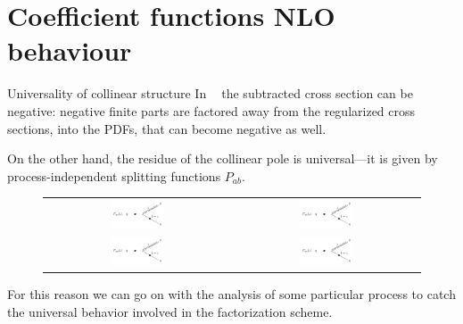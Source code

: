 \documentclass[9pt]{beamer}
\DeclareMathOperator{\msbar}{\overline{MS}}
\begin{document}
\section{Coefficient functions NLO behaviour}
\begin{frame}{Universality of collinear structure}
    In $\msbar$ the subtracted cross section can be negative: negative finite
    parts are factored away from the regularized cross sections, into the PDFs,
    that can become negative as well.

    On the other hand, the residue of the collinear pole is universal—it is
    given by process-independent splitting functions $P_{ab}$.
    \begin{figure}
        \begin{tabular}{cc}
          \includegraphics[width=0.3\textwidth]{pictures/feynd/Pqq} &   \includegraphics[width=0.3\textwidth]{pictures/feynd/Pqq} \\
          \includegraphics[width=0.3\textwidth]{pictures/feynd/Pqq} &   \includegraphics[width=0.3\textwidth]{pictures/feynd/Pqq} \\
        \end{tabular}
    \end{figure}

    For this reason we can go on with the analysis of some particular process
    to catch the universal behavior involved in the factorization scheme.
\end{frame}
\end{document}
